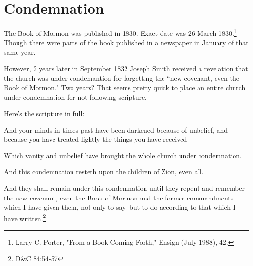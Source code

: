 \chapter{Condemnation}

The Book of Mormon was published in 1830. Exact date was 26 March 1830.\footnote{
Larry C. Porter, "From a Book Coming Forth," Ensign (July 1988), 42.} Though there
were parts of the book published in a newspaper in January of that same year.

However, 2 years later in September 1832 Joseph Smith received a revelation that the
church was under condemantion for forgetting the ``new covenant, even the Book of
Mormon." Two years? That seems pretty quick to place an entire church under
condemnation for not following scripture.

Here's the scripture in full:

\begin{displayquote}
And your minds in times past have been darkened because of unbelief, and because you 
have treated lightly the things you have received—

Which vanity and unbelief have brought the whole church under condemnation.

And this condemnation resteth upon the children of Zion, even all.

And they shall remain under this condemnation until they repent and remember the new 
covenant, even the Book of Mormon and the former commandments which I have given 
them, not only to say, but to do according to that which I have written.\footnote{
D\&C 84:54-57
}
\end{displayquote}
